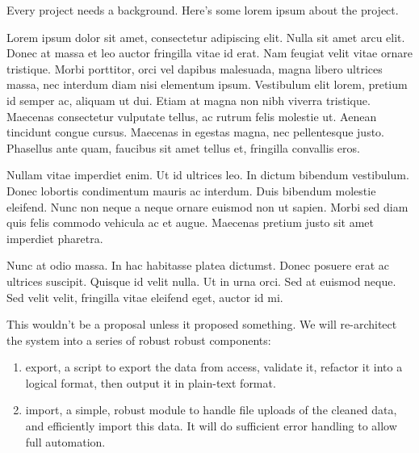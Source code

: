 \pagebreak


Every project needs a background. Here's some lorem ipsum about the project.

Lorem ipsum dolor sit amet, consectetur adipiscing elit. Nulla sit amet arcu elit. Donec at massa et leo auctor fringilla vitae id erat. Nam feugiat velit vitae ornare tristique. Morbi porttitor, orci vel dapibus malesuada, magna libero ultrices massa, nec interdum diam nisi elementum ipsum. Vestibulum elit lorem, pretium id semper ac, aliquam ut dui. Etiam at magna non nibh viverra tristique. Maecenas consectetur vulputate tellus, ac rutrum felis molestie ut. Aenean tincidunt congue cursus. Maecenas in egestas magna, nec pellentesque justo. Phasellus ante quam, faucibus sit amet tellus et, fringilla convallis eros.

Nullam vitae imperdiet enim. Ut id ultrices leo. In dictum bibendum vestibulum. Donec lobortis condimentum mauris ac interdum. Duis bibendum molestie eleifend. Nunc non neque a neque ornare euismod non ut sapien. Morbi sed diam quis felis commodo vehicula ac et augue. Maecenas pretium justo sit amet imperdiet pharetra.

Nunc at odio massa. In hac habitasse platea dictumst. Donec posuere erat ac ultrices suscipit. Quisque id velit nulla. Ut in urna orci. Sed at euismod neque. Sed velit velit, fringilla vitae eleifend eget, auctor id mi.

\pagebreak


This wouldn't be a proposal unless it proposed something. We will re-architect the system into a series of robust robust components:

\begin{enumerate}
\itemsep1pt\parskip0pt
\item
  export, a script to export the data from access, validate it, refactor it into a logical format, then output it in plain-text format.
\item
  import, a simple, robust module to handle file uploads of the cleaned data, and efficiently import this data. It will do sufficient error handling to allow full automation.
\end{enumerate}

